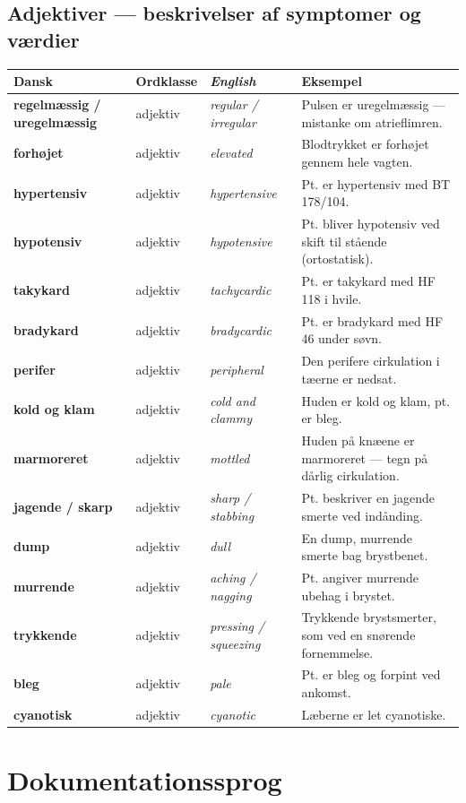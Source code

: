 \documentclass[11pt,a4paper]{report}
\makeatletter
\newcommand{\eng}[1]{\textcolor{en}{\itshape #1}}       %
\newcommand{\da}[1]{\textbf{#1}}
\newenvironment{glos}{%
  \small\renewcommand{\arraystretch}{1.35}
  \begin{longtable}{@{}>{\raggedright\arraybackslash}p{3.3cm}
                        >{\raggedright\arraybackslash}p{1.7cm}
                        >{\raggedright\arraybackslash}p{3.2cm}
                        >{\raggedright\arraybackslash}p{6.0cm}@{}}
  \toprule
  \textbf{Dansk} & \textbf{Ordklasse} & \eng{English} & \textbf{Eksempel} \\ \midrule
  \endhead
}{\bottomrule\end{longtable}}
\makeatother
\begin{document}
\subsection{Adjektiver --- beskrivelser af symptomer og værdier}
\begin{glos}
\da{regelmæssig / uregelmæssig} & adjektiv & \eng{regular / irregular} & Pulsen er uregelmæssig --- mistanke om atrieflimren. \\
\da{forhøjet} & adjektiv & \eng{elevated} & Blodtrykket er forhøjet gennem hele vagten. \\
\da{hypertensiv} & adjektiv & \eng{hypertensive} & Pt. er hypertensiv med BT 178/104. \\
\da{hypotensiv} & adjektiv & \eng{hypotensive} & Pt. bliver hypotensiv ved skift til stående (ortostatisk). \\
\da{takykard} & adjektiv & \eng{tachycardic} & Pt. er takykard med HF 118 i hvile. \\
\da{bradykard} & adjektiv & \eng{bradycardic} & Pt. er bradykard med HF 46 under søvn. \\
\da{perifer} & adjektiv & \eng{peripheral} & Den perifere cirkulation i tæerne er nedsat. \\
\da{kold og klam} & adjektiv & \eng{cold and clammy} & Huden er kold og klam, pt. er bleg. \\
\da{marmoreret} & adjektiv & \eng{mottled} & Huden på knæene er marmoreret --- tegn på dårlig cirkulation. \\
\da{jagende / skarp} & adjektiv & \eng{sharp / stabbing} & Pt. beskriver en jagende smerte ved indånding. \\
\da{dump} & adjektiv & \eng{dull} & En dump, murrende smerte bag brystbenet. \\
\da{murrende} & adjektiv & \eng{aching / nagging} & Pt. angiver murrende ubehag i brystet. \\
\da{trykkende} & adjektiv & \eng{pressing / squeezing} & Trykkende brystsmerter, som ved en snørende fornemmelse. \\
\da{bleg} & adjektiv & \eng{pale} & Pt. er bleg og forpint ved ankomst. \\
\da{cyanotisk} & adjektiv & \eng{cyanotic} & Læberne er let cyanotiske. \\
\end{glos}

\section{Dokumentationssprog}
\end{document}
